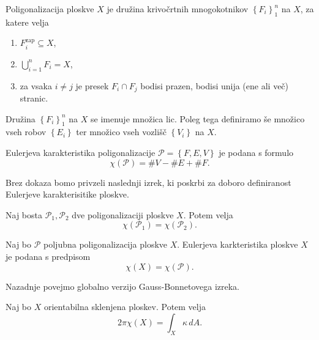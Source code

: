 \begin{definicija}
\label{def_poligonalizacija_ploskve}
Poligonalizacija ploskve $X$ je družina krivočrtnih mnogokotnikov $\left\{ F_i\right\}_1^{n}$ na $X$, za katere velja \begin{enumerate}
    \item  $F_i^{\text{zap}} \subseteq  X$, 
    \item $\bigcup_{i = 1}^{n} F_i = X$,
    \item za vsaka $i \neq j$ je presek $F_i \cap  F_j$ bodisi prazen, bodisi unija (ene ali več) stranic. 
\end{enumerate}
Družina $\left\{ F_i\right\}_1^{n}$ na $X$ se imenuje množica lic. Poleg tega definiramo še množico vseh robov $\left\{ E_i\right\}$ ter množico vseh vozlišč $\left\{ V_i\right\}$ na $X$.
\end{definicija}

\begin{definicija}
\label{def_Eulerjeva_karakteristika}
Eulerjeva karakteristika poligonalizacije $\mathcal{P} = \left\{ F, E, V\right\}$ je podana s formulo \begin{equation*}
\chi(\mathcal{P}) =  \#V -  \#E + \#F.
\end{equation*}  
\end{definicija}

Brez dokaza bomo privzeli naslednji izrek, ki poskrbi za doboro definiranost Eulerjeve karakterisitike ploskve.
\begin{izrek}
\label{izr_dobra_definiranost_Eulerjeve_karkteristike}
 Naj bosta $\mathcal{P}_1, \mathcal{P}_2$ dve poligonalizaciji ploskve $X$. Potem velja \begin{equation*}
 \chi(\mathcal{P}_1) = \chi(\mathcal{P}_2).
\end{equation*}  
\end{izrek}

\begin{definicija}
\label{def_Eulerjeva_karkteristika}
Naj bo $\mathcal{P}$ poljubna poligonalizacija ploskve $X$. Eulerjeva karkteristika ploskve $X$ je podana s predpisom \begin{equation*}
\chi(X) = \chi(\mathcal{P}).
\end{equation*}  
   
\end{definicija}

Nazadnje povejmo globalno verzijo Gauss-Bonnetovega izreka.

\begin{izrek}
\label{izr_globalni_GB}
Naj bo $X$ orientabilna sklenjena ploskev. Potem velja \begin{equation*}
2 \pi \chi(X) = \int_{X} \kappa \, dA.
\end{equation*}  
\end{izrek}




